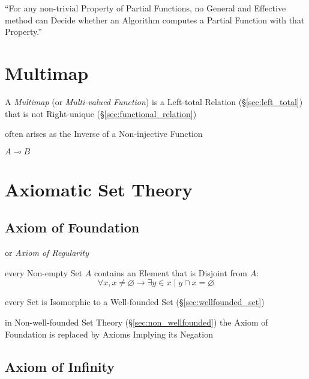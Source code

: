 ``For any non-trivial Property of Partial Functions, no General and
Effective method can Decide whether an Algorithm computes a Partial
Function with that Property.''



\section{Multimap}\label{sec:multimap}

A \emph{Multimap} (or \emph{Multi-valued Function}) is a Left-total
Relation (\S\ref{sec:left_total}) that is not Right-unique
(\S\ref{sec:functional_relation})

often arises as the Inverse of a Non-injective Function

$A \multimap B$



\section{Axiomatic Set Theory}\label{sec:axiomatic_set_theory}

\subsection{Axiom of Foundation}\label{sec:foundation_axiom}

or \emph{Axiom of Regularity}

every Non-empty Set $A$ contains an Element that is Disjoint from $A$:
\[
  \forall x, x \neq \varnothing \rightarrow \exists y \in x \mid y
  \cap x = \varnothing
\]

every Set is Isomorphic to a Well-founded Set
(\S\ref{sec:wellfounded_set})

in Non-well-founded Set Theory (\S\ref{sec:non_wellfounded}) the Axiom
of Foundation is replaced by Axioms Implying its Negation



\subsection{Axiom of Infinity}\label{sec:infinity_axiom}

